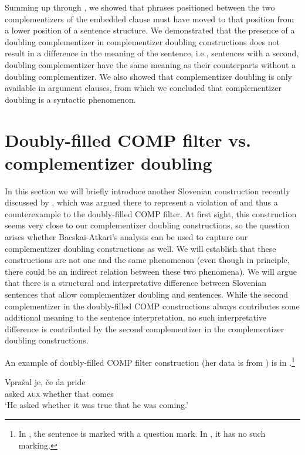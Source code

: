 \documentclass[output=paper,
]{langscibook}
\begin{document}
Summing up  through , we showed that phrases positioned between the two complementizers of the embedded clause must have moved to that position from a lower position of a sentence structure. We demonstrated that the presence of a doubling complementizer in complementizer doubling constructions does not result in a difference in the meaning of the sentence, i.e., sentences with a second, doubling complementizer have the same meaning as their counterparts without a doubling complementizer. We also showed that complementizer doubling is only available in argument clauses, from which we concluded that complementizer doubling is a syntactic phenomenon. 

\section{Doubly-filled COMP filter vs. complementizer doubling} \label{sec:plesnicar:s3}

In this section we will briefly introduce another Slovenian construction recently discussed by \cite{Bacskai2016}, which was argued there to represent a violation of and thus a counterexample to the doubly-filled COMP filter. At first sight, this construction seems very close to our complementizer doubling constructions, so the question arises whether Bacskai-Atkari’s analysis can be used to capture our complementizer doubling constructions as well. We will establish that these constructions are not one and the same phenomenon (even though in principle, there could be an indirect relation between these two phenomena). We will argue that there is a structural and interpretative difference between Slovenian sentences that allow complementizer doubling and   sentences. While the second complementizer in the doubly-filled COMP constructions always contributes some additional meaning to the sentence interpretation, no such interpretative difference is contributed by the second complementizer in the complementizer doubling constructions.

An example of   doubly-filled COMP filter construction (her data is from \citealt{hladnik2010restrictive}) is in .\footnote{In \citet{Bacskai2016}, the sentence is marked with a question mark. In \citet[(15)]{hladnik2010restrictive}, it has no such marking.}

\begin{exe} 
\ex \label{ex:plesnicar:fourteen}
\gll Vprašal 	je, 	če 		da 	pride \\
	asked 		\textsc{aux}	whether	that 	comes \\
\trans `He asked whether it was true that he was coming.' 
\end{exe}
\end{document}
